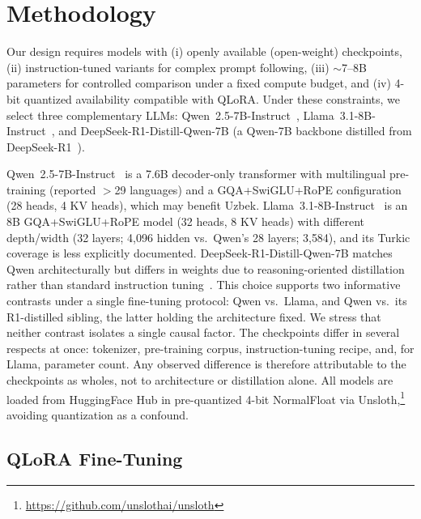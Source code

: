 \documentclass[bdcc,article,submit,moreauthors]{Definitions/mdpi}
\begin{document}

\section{Methodology}
\label{sec:methodology}

Our design requires models with (i) openly available (open-weight) checkpoints, (ii) instruction-tuned variants for complex prompt following, (iii) $\sim$7--8B parameters for controlled comparison under a fixed compute budget, and (iv) 4-bit quantized availability compatible with QLoRA. Under these constraints, we select three complementary LLMs: Qwen~2.5-7B-Instruct~\cite{Qwen2024-kr}, Llama~3.1-8B-Instruct~\cite{Grattafiori2024-ka}, and DeepSeek-R1-Distill-Qwen-7B (a Qwen-7B backbone distilled from DeepSeek-R1~\cite{Guo2025}).

Qwen~2.5-7B-Instruct~\cite{Qwen2024-kr} is a 7.6B decoder-only transformer with multilingual pre-training (reported $>$29 languages) and a GQA+SwiGLU+RoPE configuration (28 heads, 4 KV heads), which may benefit Uzbek. Llama~3.1-8B-Instruct~\cite{Grattafiori2024-ka} is an 8B GQA+SwiGLU+RoPE model (32 heads, 8 KV heads) with different depth/width (32 layers; 4{,}096 hidden vs.\ Qwen's 28 layers; 3{,}584), and its Turkic coverage is less explicitly documented. DeepSeek-R1-Distill-Qwen-7B matches Qwen architecturally but differs in weights due to reasoning-oriented distillation rather than standard instruction tuning~\cite{Guo2025}. This choice supports two informative contrasts under a single fine-tuning protocol: Qwen vs.\ Llama, and Qwen vs.\ its R1-distilled sibling, the latter holding the architecture fixed. We stress that neither contrast isolates a single causal factor. The checkpoints differ in several respects at once: tokenizer, pre-training corpus, instruction-tuning recipe, and, for Llama, parameter count. Any observed difference is therefore attributable to the checkpoints as wholes, not to architecture or distillation alone. All models are loaded from HuggingFace Hub in pre-quantized 4-bit NormalFloat via Unsloth,\footnote{\url{https://github.com/unslothai/unsloth}} avoiding quantization as a confound.
\subsection{QLoRA Fine-Tuning}
\label{sec:meth_qlora}
\end{document}
